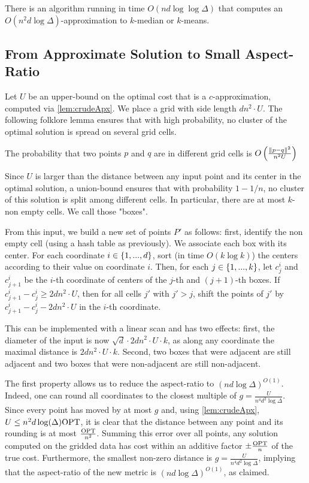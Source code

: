 \begin{lemma}\label{lem:crudeApx}
There is an algorithm running in time $O(nd \log \log \Delta)$ that computes an  $O(n^2 d \log \Delta)$-approximation to $k$-median or $k$-means.
\end{lemma}

\subsection{From Approximate Solution to Small Aspect-Ratio}
Let $U$ be an upper-bound on the optimal cost that is a $c$-approximation, computed via \cref{lem:crudeApx}. We place a grid with side length $d n^2\cdot U$.
The following folklore lemma ensures that with high probability, no cluster of the optimal solution is spread on several grid cells.

\begin{lemma}
The probability that two points $p$ and $q$ are in different grid cells is $O\left( \frac{\|p-q\|^2}{n^2 U}\right)$
\end{lemma}

Since $U$ is larger than the distance between any input point and its center in the optimal solution, a union-bound ensures that with probability $1-1/n$, no
cluster of this solution is split among different cells.  In particular, there are at most $k$-non empty cells. We call those "boxes".

From this input, we build a new set of points $P'$ as follows: first, identify the non empty cell (using a hash table as previously). We associate each box with
its center.  For each coordinate $i \in \left\{ 1, ..., d \right\}$, sort (in time $O(k \log k)$) the centers according to their value on coordinate $i$. Then, for
each $j \in \left\{ 1, ..., k\right\}$, let $c^i_j$ and $c^i_{j+1}$ be the $i$-th coordinate of centers of the $j$-th and $(j+1)$-th boxes. If $c^i_{j+1} - c^i_j
\geq 2d n^2\cdot U$, then for all cells $j'$ with $j' > j$, shift the points of $j'$ by $c^i_{j+1} - c^i_j - 2d n^2\cdot U$ in the $i$-th coordinate.

This can be implemented with a linear scan and has two effects: first, the diameter of the input is now $\sqrt{d} \cdot 2d n^2\cdot U \cdot k$, as along any
coordinate the maximal distance is $2d n^2\cdot U \cdot k$. Second, two boxes that were adjacent are still adjacent and two boxes that were non-adjacent are
still non-adjacent.

The first property allows us to reduce the aspect-ratio to $(nd \log \Delta)^{O(1)}$.  Indeed, one can round all coordinates to the closest multiple of
$g = \frac{U}{n^4 d^{2} \log \Delta}$. Since every point has moved by at most $g$ and, using \cref{lem:crudeApx}, $U
\leq n^2 d \log(\Delta) \text{OPT}$, it is clear that the distance between any point and its rounding is at most $\frac{\text{OPT}}{n^2}$. Summing this error over all points,
any solution computed on the gridded data has cost within an additive factor $\pm \frac{\text{OPT}}{n}$ of the true cost. Furthermore, the smallest
non-zero distance is $g = \frac{U}{n^4 d^{2} \log \Delta}$, implying that the aspect-ratio of the new metric is $(nd \log \Delta)^{O(1)}$,
as claimed.

